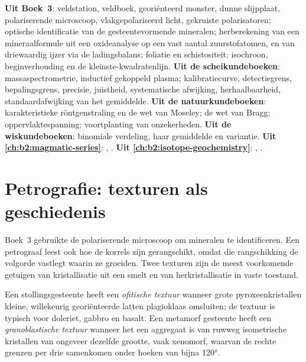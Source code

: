 \begin{recall}
\textbf{Uit Boek~3}: veldstation, veldboek, georiënteerd monster, dunne slijpplaat,
polariserende microscoop, vlakgepolariseerd licht, gekruiste polarisatoren; optische identificatie van de gesteentevormende
mineralen; herberekening van een mineraalformule uit een oxideanalyse op een vast aantal zuurstofatomen,
en van driewaardig ijzer via de ladingsbalans; foliatie en schistositeit; isochroon, beginverhouding en de
kleinste-kwadratenlijn. \textbf{Uit de scheikundeboeken}: massaspectrometrie, inductief gekoppeld plasma;
kalibratiecurve, detectiegrens, bepalingsgrens, precisie, juistheid, systematische afwijking,
herhaalbaarheid, standaardafwijking van het gemiddelde. \textbf{Uit de natuurkundeboeken}: karakteristieke röntgenstraling
en de wet van Moseley; de wet van Bragg; oppervlaktespanning; voortplanting van onzekerheden.
\textbf{Uit de wiskundeboeken}: binomiale verdeling, haar gemiddelde en variantie.
\textbf{Uit \cref{ch:b2:magmatic-series}}: , .
\textbf{Uit \cref{ch:b2:isotope-geochemistry}}: , .
\end{recall}

\section{Petrografie: texturen als geschiedenis}\label{sec:b2:field-lab-methods-2:petrography}

Boek~3 gebruikte de polariserende microscoop om mineralen te identificeren. Een petrograaf leest ook
hoe de korrels zijn gerangschikt, omdat die rangschikking de volgorde vastlegt waarin ze groeiden. Twee
texturen zijn de meest voorkomende getuigen van kristallisatie uit een smelt en van herkristallisatie in
vaste toestand.

\begin{definition}\label{def:b2:field-lab-methods-2:textures}
Een stollingsgesteente heeft een \emph{ofitische textuur} wanneer grote pyroxeenkristallen
kleine, willekeurig georiënteerde latten plagioklaas omsluiten; de textuur is typisch voor doleriet, gabbro
en basalt. Een metamorf gesteente heeft een \emph{granoblastische textuur} wanneer het
een aggregaat is van ruwweg isometrische kristallen van ongeveer dezelfde grootte, vaak xenomorf,
waarvan de rechte grenzen per drie samenkomen onder hoeken van bijna \ang{120}.
\end{definition}

